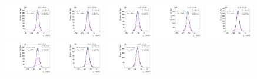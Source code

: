 \begin{figure}[htb]
\includegraphics[width=0.19\textwidth]{plots/Appendix_Recoil_Fits/WmmMC_PF_13TeV_2G/pfu1fit_25.pdf}
\includegraphics[width=0.19\textwidth]{plots/Appendix_Recoil_Fits/WmmMC_PF_13TeV_2G/pfu1fit_26.pdf}
\includegraphics[width=0.19\textwidth]{plots/Appendix_Recoil_Fits/WmmMC_PF_13TeV_2G/pfu1fit_27.pdf}
\includegraphics[width=0.19\textwidth]{plots/Appendix_Recoil_Fits/WmmMC_PF_13TeV_2G/pfu1fit_28.pdf}
\includegraphics[width=0.19\textwidth]{plots/Appendix_Recoil_Fits/WmmMC_PF_13TeV_2G/pfu1fit_29.pdf}
\includegraphics[width=0.19\textwidth]{plots/Appendix_Recoil_Fits/WmmMC_PF_13TeV_2G/pfu1fit_30.pdf}
\includegraphics[width=0.19\textwidth]{plots/Appendix_Recoil_Fits/WmmMC_PF_13TeV_2G/pfu1fit_31.pdf}
\includegraphics[width=0.19\textwidth]{plots/Appendix_Recoil_Fits/WmmMC_PF_13TeV_2G/pfu1fit_32.pdf}

\end{figure}
